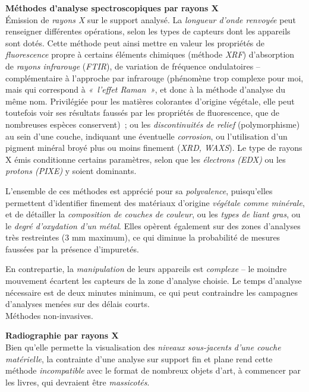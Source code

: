 \documentclass[a4paper,12pt, twoside]{book}
\begin{document}
\large \textbf{\textcolor{teal2}{Méthodes d’analyse spectroscopiques par rayons X}}\\

\normalsize
Émission de \emph{rayons X} sur le support analysé. La \emph{longueur d’onde renvoyée} peut renseigner différentes opérations, selon les types de capteurs dont les appareils sont dotés. Cette méthode peut ainsi mettre en valeur les propriétés de \emph{fluorescence} propre à certains éléments chimiques (méthode \emph{XRF}) d’absorption de \emph{rayons infrarouge} (\emph{FTIR}), de variation de fréquence ondulatoires – complémentaire à l’approche par infrarouge (phénomène trop complexe pour moi, mais qui correspond à \emph{«~l’effet Raman~»}, et donc à la méthode d’analyse du même nom. Privilégiée pour les matières colorantes d’origine végétale, elle peut toutefois voir ses résultats faussés par les propriétés de fluorescence, que de nombreuses espèces conservent)~; ou les \emph{discontinuités de relief} (polymorphisme) au sein d’une couche, indiquant une éventuelle \emph{corrosion}, ou l’utilisation d’un pigment minéral broyé plus ou moins finement (\emph{XRD, WAXS}). Le type de rayons X émis conditionne certains paramètres, selon que les \emph{électrons (EDX)} ou les \emph{protons (PIXE)} y soient dominants.

L’ensemble de ces méthodes est apprécié pour sa \emph{polyvalence}, puisqu’elles permettent d’identifier finement des matériaux d’origine \emph{végétale comme minérale}, et de détailler la \emph{composition de couches de couleur}, ou les \emph{types de liant gras}, ou le \emph{degré d’oxydation d’un métal}. Elles opèrent également sur des zones d’analyses très restreintes (3 mm maximum), ce qui diminue la probabilité de mesures faussées par la présence d’impuretés.

En contrepartie, la \emph{manipulation} de leurs appareils est \emph{complexe} – le moindre mouvement écartent les capteurs de la zone d’analyse choisie. Le temps d’analyse nécessaire est de deux minutes minimum, ce qui peut contraindre les campagnes d’analyses menées sur des délais courts.\\
Méthodes non-invasives.

\large \textbf{\textcolor{teal2}{Radiographie par rayons X}}\\

\normalsize
Bien qu’elle permette la visualisation des \emph{niveaux sous-jacents d’une couche matérielle}, la contrainte d’une analyse sur support fin et plane rend cette méthode \emph{incompatible} avec le format de nombreux objets d’art, à commencer par les livres, qui devraient être \emph{massicotés}.
\end{document}
